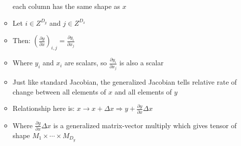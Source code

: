 \documentclass[12pt]{article}
\begin{document}
\begin{itemize}
\begin{itemize}
      each column has the same shape as $x$
      \item Let $i \in Z^{D_y}$ and $j \in Z^{D_x}$
      \item Then: $(\frac{\partial y}{\partial x})_{i, j} = \frac{\partial y_i}{\partial x_j}$
      \item Where $y_i$ and $x_i$ are scalars, so $\frac{\partial y_i}{\partial x_j}$ is also a scalar 
      \item Just like standard Jacobian, the generalized Jacobian tells relative rate of change between all elements of $x$ and all elements of $y$
      \item Relationship here is: $x \rightarrow x + \Delta x \Rightarrow y + \frac{\partial y}{\partial x}\Delta x$
      \item Where $\frac{\partial y}{\partial x}\Delta x$ is a generalized matrix-vector multiply which gives tensor of shape $M_1 \times \dotsi \times M_{D_y}$
    \end{itemize}
  \end{itemize}
\end{document}
